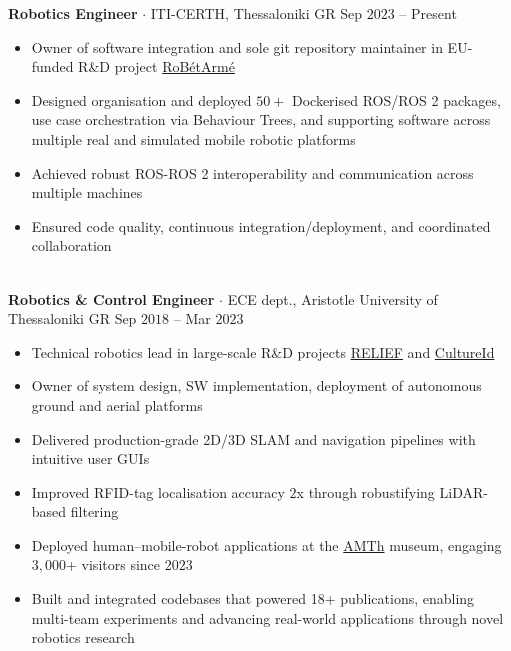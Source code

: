 \documentclass[a4paper,10pt,twoside]{article}
\newcommand{\verticalspaceafteritem}{\vspace{-0.8em}}
\begin{document}
  \noindent\textbf{Robotics Engineer} $\cdot$ ITI-CERTH, Thessaloniki GR \hfill {\small Sep $2023$ -- Present} \\
  \begin{minipage}[t]{\textwidth}
    \begin{itemize}
      \item Owner of software integration and sole git repository maintainer in EU-funded R\&D project \href{https://www.robetarme-project.eu/}{RoBétArmé}\verticalspaceafteritem
      \item Designed organisation and deployed $50+$ Dockerised ROS/ROS 2 packages, use case orchestration via Behaviour Trees, and supporting software across multiple real and simulated mobile robotic platforms \verticalspaceafteritem
      \item Achieved robust ROS-ROS 2 interoperability and communication across multiple machines\verticalspaceafteritem
      \item Ensured code quality, continuous integration/deployment, and coordinated collaboration
    \end{itemize}
  \end{minipage} \\[0.4em]

  \noindent\textbf{Robotics \& Control Engineer} $\cdot$ ECE dept., Aristotle University of Thessaloniki GR \hfill {\small Sep $2018$ -- Mar $2023$} \\
  \begin{minipage}[t]{\textwidth}
    \begin{itemize}
      \item Technical robotics lead in large-scale R\&D projects \href{https://relief.web.auth.gr/language/en/home/}{RELIEF} and \href{https://cultureid.web.auth.gr/?page\_id=200&lang=en}{CultureId} \verticalspaceafteritem
      \item Owner of system design, SW implementation, deployment of autonomous ground and aerial platforms \verticalspaceafteritem
      \item Delivered production-grade 2D/3D SLAM and navigation pipelines with intuitive user GUIs \verticalspaceafteritem
      \item Improved RFID-tag localisation accuracy $2$x through robustifying LiDAR-based filtering \verticalspaceafteritem
      \item Deployed human--mobile-robot applications at the \href{https://www.amth.gr/en}{AMTh} museum, engaging $3,000$+ visitors since $2023$ \verticalspaceafteritem
      \item Built and integrated codebases that powered 18+ publications, enabling multi-team experiments and advancing real-world applications through novel robotics research
    \end{itemize}
  \end{minipage} \\[0.4em]
\end{document}
